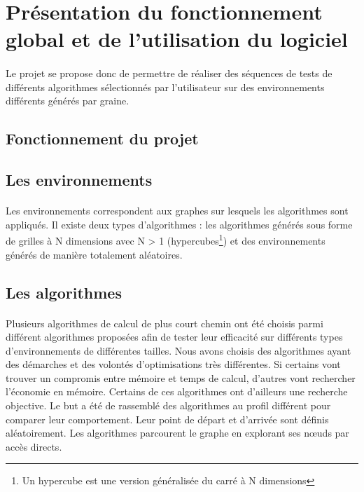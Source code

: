 \documentclass[pidr]{tnreport}
\begin{document}
	\section{Présentation du fonctionnement global et de l'utilisation du logiciel}

\paragraph{}
Le projet se propose donc de permettre de réaliser des séquences de tests de différents algorithmes sélectionnés par l'utilisateur sur des environnements différents générés par graine.

		\subsection{Fonctionnement du projet}
		
			\subsection{Les environnements}

\paragraph{}
Les environnements correspondent aux graphes sur lesquels les algorithmes sont appliqués. Il existe deux types d'algorithmes : les algorithmes générés sous forme de grilles à N dimensions avec N > 1 (hypercubes\footnote{Un hypercube est une version généralisée du carré à N dimensions}) et des environnements générés de manière totalement aléatoires.
			
			\subsection{Les algorithmes}
				
\paragraph{}
Plusieurs algorithmes de calcul de plus court chemin ont été choisis parmi différent algorithmes proposées afin de tester leur efficacité sur différents types d'environnements de différentes tailles. Nous avons choisis des algorithmes ayant des démarches et des volontés d'optimisations très différentes. Si certains vont trouver un compromis entre mémoire et temps de calcul, d'autres vont rechercher l'économie en mémoire. Certains de ces algorithmes ont d'ailleurs une recherche objective. Le but a été de rassemblé des algorithmes au profil différent pour comparer leur comportement. Leur point de départ et d'arrivée sont définis aléatoirement. Les algorithmes parcourent le graphe en explorant ses nœuds par accès directs.
		
\end{document}
